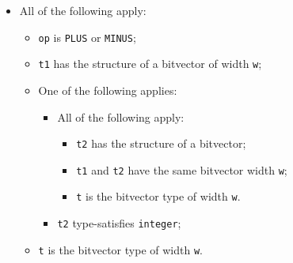 \documentclass{book}
\begin{document}
\begin{itemize}
  \item All of the following apply:
    \begin{itemize}
    \item \texttt{op} is \texttt{PLUS} or \texttt{MINUS};
    \item \texttt{t1} has the structure of a bitvector of width \texttt{w};
    \item One of the following applies:
      \begin{itemize}
	    \item All of the following apply:
          \begin{itemize}
		    \item \texttt{t2} has the structure of a bitvector;
    		\item \texttt{t1} and \texttt{t2} have the same bitvector width \texttt{w};
    		\item \texttt{t} is the bitvector type of width \texttt{w}.
          \end{itemize}    
    	\item \texttt{t2} type-satisfies \texttt{integer};
      \end{itemize}    
    \item \texttt{t} is the bitvector type of width \texttt{w}.
    \end{itemize}


\end{itemize}
\end{document}
